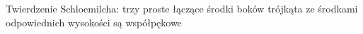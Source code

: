 Twierdzenie Schloemilcha: trzy proste łączące środki boków trójkąta ze środkami odpowiednich wysokości są współpękowe %
